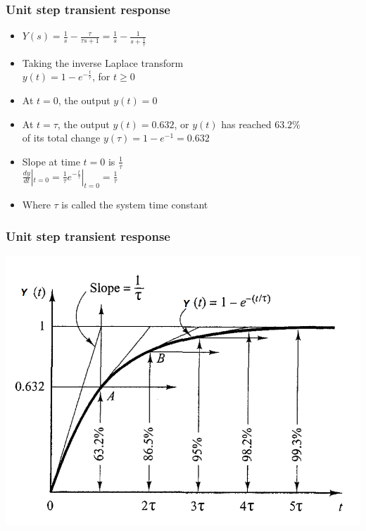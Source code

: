 \begin{frame}
\frametitle{Unit step transient response}
\begin{itemize}
\item$Y(s)= \frac{1}{s} - \frac{\tau}{\tau s +1} = \frac{1}{s} - \frac{1}{s+\frac{1}{\tau}}$
\vspace{0.25cm}
\item Taking the inverse Laplace transform
\vspace{0.25cm}
\\ $y(t) = 1 - e^{-\frac{t}{\tau}}$, for $t\ge 0$ 
\vspace{0.25cm}
\item At $t=0$, the output $y(t)=0$
\vspace{0.25cm}
\item At $t=\tau$, the output $y(t)=0.632$, or $y(t)$ has reached $63.2\% $ 
\vspace{0.25cm} \\of its total change $y(\tau)= 1 - e^{-1} = 0.632$
\vspace{0.25cm}
\item Slope at time $t=0$ is $\frac{1}{\tau}$
\vspace{0.25cm}
\\ $\frac{dy}{dt}|_{t=0} = \frac{1}{\tau}e^{-\frac{t}{\tau}}|_{t=0} = \frac{1}{\tau}$
\vspace{0.25cm}
\item Where $\tau$ is called the system time constant
\end{itemize}
\end{frame}

\begin{frame}
\frametitle{Unit step transient response}
\includegraphics[width=1\linewidth]{Afbeelding2}
\end{frame}

